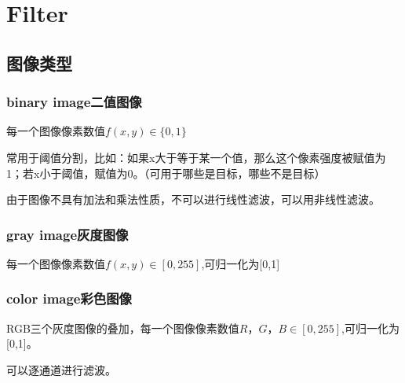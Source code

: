 \documentclass[UTF8]{ctexart}
\begin{document}
\section{Filter}

\subsection{图像类型}

\subsubsection{binary image二值图像}
每一个图像像素数值$f(x,y)\in \{0,1\}$

常用于阈值分割，比如：如果x大于等于某一个值，那么这个像素强度被赋值为1；若x小于阈值，赋值为0。（可用于哪些是目标，哪些不是目标）

由于图像不具有加法和乘法性质，不可以进行线性滤波，可以用非线性滤波。

\subsubsection{gray image灰度图像}

每一个图像像素数值$f(x,y)\in [0,255]$,可归一化为[0,1]

\subsubsection{color image彩色图像}

RGB三个灰度图像的叠加，每一个图像像素数值$R，G，B\in [0,255]$,可归一化为[0,1]。

可以逐通道进行滤波。
\end{document}
